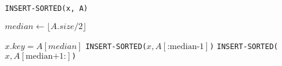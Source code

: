 \begin{algorithm}[H]
  \caption{\texttt{INSERT-SORTED(x, A)}}\label{alg:insertsorted}

  \BlankLine

  $median \gets \lfloor A.size/2 \rfloor$\;


  $x.key = A[median]$\;
  \texttt{INSERT-SORTED($x, A[\text{:median-1}]$)}\;
  \texttt{INSERT-SORTED($x, A[\text{median+1:}]$)}
\end{algorithm}